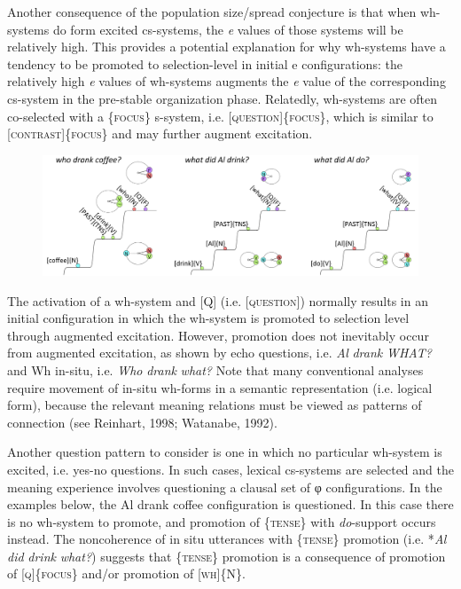   Another consequence of the population size/spread conjecture is that when wh-systems do form excited cs-systems, the \textit{e} values of those systems will be relatively high. This provides a potential explanation for why wh-systems have a tendency to be promoted to selection-level in initial e configurations: the relatively high \textit{e} values of wh-systems augments the \textit{e} value of the corresponding cs-system in the pre-stable organization phase. Relatedly, wh-systems are often co-selected with a \{\textsc{focus}\} s-system, i.e. [\textsc{question}]\{\textsc{focus}\}, which is similar to [\textsc{contrast}]\{\textsc{focus}\} and may further augment excitation.

  
\begin{figure}
\includegraphics[width=\textwidth]{figures/Tilsen-img159.png}
\caption{\missingcaption}
\label{fig:}
\end{figure}
 

  The activation of a wh-system and [Q] (i.e. [\textsc{question}]) normally results in an initial configuration in which the wh-system is promoted to selection level through augmented excitation. However, promotion does not inevitably occur from augmented excitation, as shown by echo questions, i.e. \textit{Al} \textit{drank} \textit{WHAT?} and Wh in-situ, i.e. \textit{Who} \textit{drank} \textit{what?} Note that many conventional analyses require movement of in-situ wh-forms in a semantic representation (i.e. logical form), because the relevant meaning relations must be viewed as patterns of connection (see Reinhart, 1998; Watanabe, 1992).

  Another question pattern to consider is one in which no particular wh-system is excited, i.e. yes-no questions. In such cases, lexical cs-systems are selected and the meaning experience involves questioning a clausal set of φ configurations. In the examples below, the {\textbar}Al drank coffee{\textbar} configuration is questioned. In this case there is no wh-system to promote, and promotion of \{\textsc{tense}\} with \textit{do}{}-support occurs instead. The noncoherence of in situ utterances with \{\textsc{tense}\} promotion (i.e. *\textit{Al} \textit{did} \textit{drink} \textit{what?}) suggests that \{\textsc{tense}\} promotion is a consequence of promotion of [\textsc{q}]\{\textsc{focus}\} and/or promotion of [\textsc{wh}]\{N\}. 

